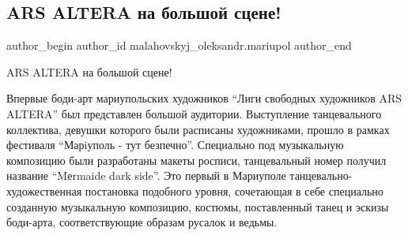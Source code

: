  
 
 
 
 

\subsection{ARS ALTERA на большой сцене!}
\label{sec:21_11_2016.fb.malahovskyj_oleksandr.mariupol.1.ars_altera_na_bolsho}

\ifcmt
 author_begin
   author_id malahovskyj_oleksandr.mariupol
 author_end
\fi

ARS ALTERA на большой сцене!

Впервые боди-арт мариупольских художников \enquote{Лиги свободных художников ARS
ALTERA} был представлен большой аудитории. Выступление танцевального
коллектива, девушки которого были расписаны художниками, прошло в рамках
фестиваля \enquote{Марiуполь - тут безпечно}. Специально под музыкальную композицию
были разработаны макеты росписи, танцевальный номер получил название \enquote{Mеrmaide
dark side}. Это первый в Мариуполе танцевально-художественная постановка
подобного уровня, сочетающая в себе специально созданную музыкальную
композицию, костюмы, поставленный танец и эскизы боди-арта, соответствующие
образам русалок и ведьмы.

